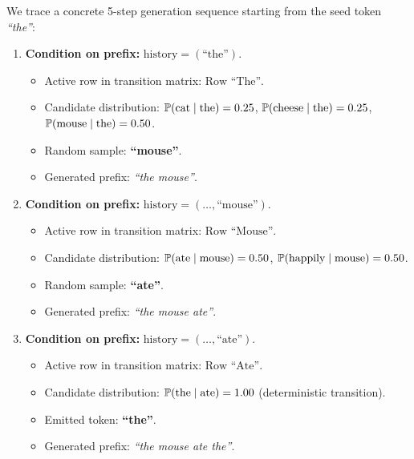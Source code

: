\documentclass[../../main.tex]{subfiles}
\begin{document}
We trace a concrete 5-step generation sequence starting from the seed token \textit{``the''}:

\begin{enumerate}[label=\textbf{Step \arabic*:}, leftmargin=2.0cm]
    \item \textbf{Condition on prefix:} $\text{history} = (\text{``the''})$.
    \begin{itemize}
        \item Active row in transition matrix: $\text{Row ``The''}$.
        \item Candidate distribution: $\mathbb{P}(\text{cat}\mid\text{the}) = 0.25$, $\mathbb{P}(\text{cheese}\mid\text{the}) = 0.25$, $\mathbb{P}(\text{mouse}\mid\text{the}) = 0.50$.
        \item Random sample: \textbf{``mouse''}.
        \item Generated prefix: \textit{``the mouse''}.
    \end{itemize}

    \item \textbf{Condition on prefix:} $\text{history} = (\dots, \text{``mouse''})$.
    \begin{itemize}
        \item Active row in transition matrix: $\text{Row ``Mouse''}$.
        \item Candidate distribution: $\mathbb{P}(\text{ate}\mid\text{mouse}) = 0.50$, $\mathbb{P}(\text{happily}\mid\text{mouse}) = 0.50$.
        \item Random sample: \textbf{``ate''}.
        \item Generated prefix: \textit{``the mouse ate''}.
    \end{itemize}

    \item \textbf{Condition on prefix:} $\text{history} = (\dots, \text{``ate''})$.
    \begin{itemize}
        \item Active row in transition matrix: $\text{Row ``Ate''}$.
        \item Candidate distribution: $\mathbb{P}(\text{the}\mid\text{ate}) = 1.00$ (deterministic transition).
        \item Emitted token: \textbf{``the''}.
        \item Generated prefix: \textit{``the mouse ate the''}.
    \end{itemize}


\end{enumerate}
\end{document}
